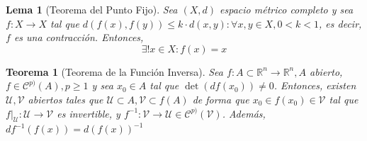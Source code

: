 \documentclass[10pt,a4paper,openright]{book}
\theoremstyle{break}
\newtheorem*{theo}{Teorema}
\newtheorem*{lema}{Lema}
\begin{document}
\begin{lema}[Teorema del Punto Fijo]
Sea $(X, d)$ espacio métrico completo y sea $f : X \to X$ tal que $d(f(x), f(y)) \leq k \cdot d(x,y) : \forall x,y \in X, 0 < k <1$, es decir, $f$ es una contracción. Entonces, 
$$\exists ! x \in X : f(x) = x$$
\end{lema}

\begin{theo}[Teorema de la Función Inversa]
Sea $f: A \subset \mathbb{R}^n \to \mathbb{R}^n, A$ abierto, $f \in \mathcal{C}^{p)} (A), p \geq 1$ y sea $x_0 \in A$ tal que $\det (df(x_0)) \neq 0$. Entonces, existen $\mathcal{U}, \mathcal{V}$ abiertos tales que $\mathcal{U} \subset A, \mathcal{V} \subset f(A)$ de forma que $x_0 \in f(x_0) \in \mathcal{V}$ tal que $f|_\mathcal{U} : \mathcal{U} \to \mathcal{V}$ es invertible, y $f^{-1} : \mathcal{V} \to \mathcal{U} \in \mathcal{C}^{p)}(\mathcal{V})$. Además, $df^{-1}(f(x)) = d(f(x))^{-1}$
\end{theo}
\end{document}
